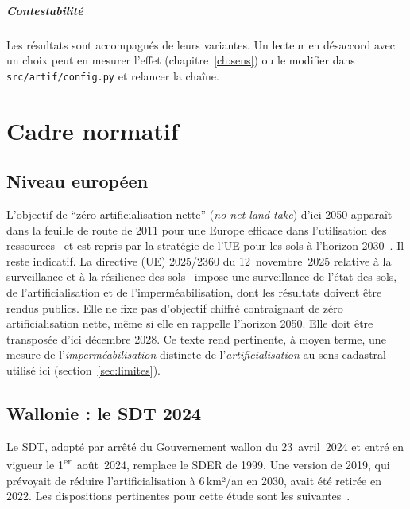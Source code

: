 \documentclass[11pt,a4paper]{report}
\newcommand{\fichier}[1]{\texttt{\small #1}}
\newcommand{\kmdan}{\,km²/an}
\begin{document}
\paragraph{Contestabilité} Les résultats sont accompagnés de leurs variantes. Un lecteur en désaccord avec un choix peut en mesurer l'effet (chapitre~\ref{ch:sens}) ou le modifier dans \fichier{src/artif/config.py} et relancer la chaîne.

\chapter{Cadre normatif}
\label{ch:cadre}

\section{Niveau européen}
L'objectif de \enquote{zéro artificialisation nette} (\emph{no net land take}) d'ici 2050 apparaît dans la feuille de route de 2011 pour une Europe efficace dans l'utilisation des ressources~\citep{ce2011} et est repris par la stratégie de l'UE pour les sols à l'horizon 2030~\citep{ce2021}. Il reste indicatif. La directive (UE) 2025/2360 du 12~novembre~2025 relative à la surveillance et à la résilience des sols~\citep{ue_sols2025} impose une surveillance de l'état des sols, de l'artificialisation et de l'imperméabilisation, dont les résultats doivent être rendus publics. Elle ne fixe pas d'objectif chiffré contraignant de zéro artificialisation nette, même si elle en rappelle l'horizon 2050. Elle doit être transposée d'ici décembre 2028. Ce texte rend pertinente, à moyen terme, une mesure de l'\emph{imperméabilisation} distincte de l'\emph{artificialisation} au sens cadastral utilisé ici (section~\ref{sec:limites}).

\section{Wallonie : le SDT 2024}
Le SDT, adopté par arrêté du Gouvernement wallon du 23~avril~2024 et entré en vigueur le 1\textsuperscript{er}~août~2024, remplace le SDER de 1999. Une version de 2019, qui prévoyait de réduire l'artificialisation à 6\kmdan{} en 2030, avait été retirée en 2022. Les dispositions pertinentes pour cette étude sont les suivantes~\citep{sdt2024}.
\end{document}
